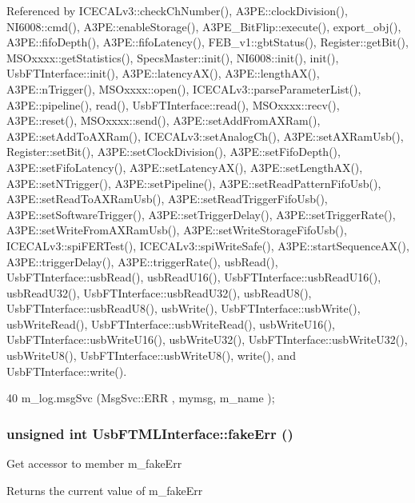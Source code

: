 Referenced by ICECALv3::checkChNumber(), A3PE::clockDivision(), NI6008::cmd(), A3PE::enableStorage(), A3PE\_\-BitFlip::execute(), export\_\-obj(), A3PE::fifoDepth(), A3PE::fifoLatency(), FEB\_\-v1::gbtStatus(), Register::getBit(), MSOxxxx::getStatistics(), SpecsMaster::init(), NI6008::init(), init(), UsbFTInterface::init(), A3PE::latencyAX(), A3PE::lengthAX(), A3PE::nTrigger(), MSOxxxx::open(), ICECALv3::parseParameterList(), A3PE::pipeline(), read(), UsbFTInterface::read(), MSOxxxx::recv(), A3PE::reset(), MSOxxxx::send(), A3PE::setAddFromAXRam(), A3PE::setAddToAXRam(), ICECALv3::setAnalogCh(), A3PE::setAXRamUsb(), Register::setBit(), A3PE::setClockDivision(), A3PE::setFifoDepth(), A3PE::setFifoLatency(), A3PE::setLatencyAX(), A3PE::setLengthAX(), A3PE::setNTrigger(), A3PE::setPipeline(), A3PE::setReadPatternFifoUsb(), A3PE::setReadToAXRamUsb(), A3PE::setReadTriggerFifoUsb(), A3PE::setSoftwareTrigger(), A3PE::setTriggerDelay(), A3PE::setTriggerRate(), A3PE::setWriteFromAXRamUsb(), A3PE::setWriteStorageFifoUsb(), ICECALv3::spiFERTest(), ICECALv3::spiWriteSafe(), A3PE::startSequenceAX(), A3PE::triggerDelay(), A3PE::triggerRate(), usbRead(), UsbFTInterface::usbRead(), usbReadU16(), UsbFTInterface::usbReadU16(), usbReadU32(), UsbFTInterface::usbReadU32(), usbReadU8(), UsbFTInterface::usbReadU8(), usbWrite(), UsbFTInterface::usbWrite(), usbWriteRead(), UsbFTInterface::usbWriteRead(), usbWriteU16(), UsbFTInterface::usbWriteU16(), usbWriteU32(), UsbFTInterface::usbWriteU32(), usbWriteU8(), UsbFTInterface::usbWriteU8(), write(), and UsbFTInterface::write().


\begin{DoxyCode}
40 { m_log.msgSvc (MsgSvc::ERR     , mymsg, m_name ); }
\end{DoxyCode}
\hypertarget{classUsbFTMLInterface_a0379dd75800521cea37580d68205f620}{
\subsubsection[{fakeErr}]{\setlength{\rightskip}{0pt plus 5cm}unsigned int UsbFTMLInterface::fakeErr ()}}
\label{classUsbFTMLInterface_a0379dd75800521cea37580d68205f620}
Get accessor to member m\_\-fakeErr \begin{DoxyReturn}{Returns}
the current value of m\_\-fakeErr 
\end{DoxyReturn}


